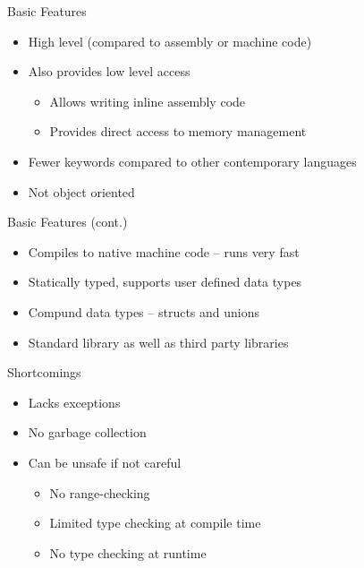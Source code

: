 \documentclass[12pt, aspectratio=169]{beamer}
\begin{document}
	\begin{frame}{Basic Features}
		\begin{itemize}
            \item High level (compared to assembly or machine code) 
            \item Also provides low level access
                \begin{itemize}
                    \item Allows writing inline assembly code
                    \item Provides direct access to memory management
                \end{itemize}
            \item Fewer keywords compared to other contemporary languages
            \item Not object oriented
        \end{itemize}
	\end{frame}

    \begin{frame}{Basic Features (cont.)}
        \begin{itemize}
            \item Compiles to native machine code -- runs very fast
            \item Statically typed, supports user defined data types
            \item Compund data types -- structs and unions
            \item Standard library as well as third party libraries
        \end{itemize}
    \end{frame}

    \begin{frame}{Shortcomings}
        \begin{itemize}
            \item Lacks exceptions
            \item No garbage collection
            \item Can be unsafe if not careful
            \begin{itemize}
                \item No range-checking
                \item Limited type checking at compile time
                \item No type checking at runtime
            \end{itemize}
        \end{itemize}
    \end{frame}
\end{document}
